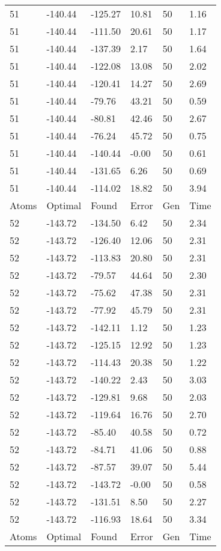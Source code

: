 \documentclass{report}
\begin{document}
\begin{appendix}
\begin{longtable}{llllll}
51 & -140.44 & -125.27 & 10.81 & 50 & 1.16 \\
51 & -140.44 & -111.50 & 20.61 & 50 & 1.17 \\
51 & -140.44 & -137.39 & 2.17 & 50 & 1.64 \\
51 & -140.44 & -122.08 & 13.08 & 50 & 2.02 \\
51 & -140.44 & -120.41 & 14.27 & 50 & 2.69 \\
51 & -140.44 & -79.76 & 43.21 & 50 & 0.59 \\
51 & -140.44 & -80.81 & 42.46 & 50 & 2.67 \\
51 & -140.44 & -76.24 & 45.72 & 50 & 0.75 \\
51 & -140.44 & -140.44 & -0.00 & 50 & 0.61 \\
51 & -140.44 & -131.65 & 6.26 & 50 & 0.69 \\
51 & -140.44 & -114.02 & 18.82 & 50 & 3.94 \\
Atoms & Optimal & Found & Error & Gen & Time \\
52 & -143.72 & -134.50 & 6.42 & 50 & 2.34 \\
52 & -143.72 & -126.40 & 12.06 & 50 & 2.31 \\
52 & -143.72 & -113.83 & 20.80 & 50 & 2.31 \\
52 & -143.72 & -79.57 & 44.64 & 50 & 2.30 \\
52 & -143.72 & -75.62 & 47.38 & 50 & 2.31 \\
52 & -143.72 & -77.92 & 45.79 & 50 & 2.31 \\
52 & -143.72 & -142.11 & 1.12 & 50 & 1.23 \\
52 & -143.72 & -125.15 & 12.92 & 50 & 1.23 \\
52 & -143.72 & -114.43 & 20.38 & 50 & 1.22 \\
52 & -143.72 & -140.22 & 2.43 & 50 & 3.03 \\
52 & -143.72 & -129.81 & 9.68 & 50 & 2.03 \\
52 & -143.72 & -119.64 & 16.76 & 50 & 2.70 \\
52 & -143.72 & -85.40 & 40.58 & 50 & 0.72 \\
52 & -143.72 & -84.71 & 41.06 & 50 & 0.88 \\
52 & -143.72 & -87.57 & 39.07 & 50 & 5.44 \\
52 & -143.72 & -143.72 & -0.00 & 50 & 0.58 \\
52 & -143.72 & -131.51 & 8.50 & 50 & 2.27 \\
52 & -143.72 & -116.93 & 18.64 & 50 & 3.34 \\
Atoms & Optimal & Found & Error & Gen & Time \\

\end{longtable}
\end{appendix}
\end{document}
